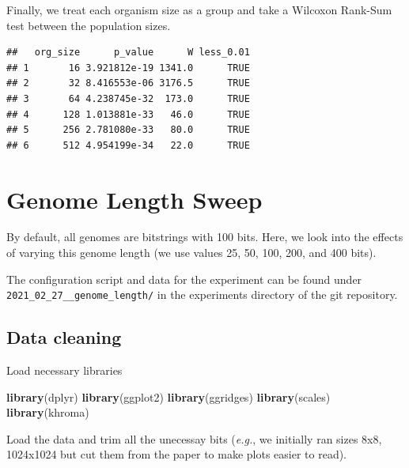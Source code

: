 \documentclass[]{book}
\newenvironment{Shaded}{\begin{snugshade}}{\end{snugshade}}
\newcommand{\KeywordTok}[1]{\textcolor[rgb]{0.13,0.29,0.53}{\textbf{#1}}}
\newcommand{\NormalTok}[1]{#1}
\begin{document}
Finally, we treat each organism size as a group and take a Wilcoxon Rank-Sum test between the population sizes.

\begin{verbatim}
##   org_size      p_value      W less_0.01
## 1       16 3.921812e-19 1341.0      TRUE
## 2       32 8.416553e-06 3176.5      TRUE
## 3       64 4.238745e-32  173.0      TRUE
## 4      128 1.013881e-33   46.0      TRUE
## 5      256 2.781080e-33   80.0      TRUE
## 6      512 4.954199e-34   22.0      TRUE
\end{verbatim}

\hypertarget{genome-length-sweep}{%
\chapter{Genome Length Sweep}\label{genome-length-sweep}}

By default, all genomes are bitstrings with 100 bits.
Here, we look into the effects of varying this genome length (we use values 25, 50, 100, 200, and 400 bits).

The configuration script and data for the experiment can be found under \texttt{2021\_02\_27\_\_genome\_length/} in the experiments directory of the git repository.

\hypertarget{data-cleaning-4}{%
\section{Data cleaning}\label{data-cleaning-4}}

Load necessary libraries

\begin{Shaded}
\begin{Highlighting}[]
\KeywordTok{library}\NormalTok{(dplyr)}
\KeywordTok{library}\NormalTok{(ggplot2)}
\KeywordTok{library}\NormalTok{(ggridges)}
\KeywordTok{library}\NormalTok{(scales)}
\KeywordTok{library}\NormalTok{(khroma)}
\end{Highlighting}
\end{Shaded}

Load the data and trim all the unecessay bits (\emph{e.g.}, we initially ran sizes 8x8, 1024x1024 but cut them from the paper to make plots easier to read).
\end{document}
